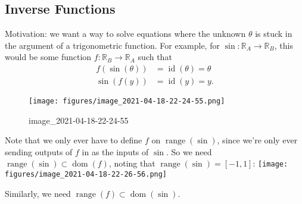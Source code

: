 \hypertarget{inverse-functions}{%
\subsection{Inverse Functions}\label{inverse-functions}}

\begin{remark}

Motivation: we want a way to solve equations where the unknown
\(\theta\) is stuck in the argument of a trigonometric function. For
example, for \(\sin: {\mathbb{R}}_A \to {\mathbb{R}}_B\), this would be
some function \(f: {\mathbb{R}}_B \to {\mathbb{R}}_A\) such that
\begin{align*}
f(\sin(\theta)) &= \operatorname{id}(\theta) = \theta \\
\sin(f(y)) &= \operatorname{id}(y) = y
.\end{align*}

\begin{figure}
\centering
\texttt{[image: figures/image\_2021-04-18-22-24-55.png]}
\caption{image\_2021-04-18-22-24-55}
\end{figure}

Note that we only ever have to define \(f\) on
\(\mathop{\mathrm{range}}(\sin)\), since we're only ever sending outputs
of \(f\) in as the inputs of \(\sin\). So we need
\(\mathop{\mathrm{range}}(\sin) \subset \operatorname{dom}(f)\), noting
that \(\mathop{\mathrm{range}}(\sin) = [-1, 1]\):
\texttt{[image: figures/image\_2021-04-18-22-26-56.png]}

Similarly, we need
\(\mathop{\mathrm{range}}(f) \subset \operatorname{dom}(\sin)\).

\end{remark}

